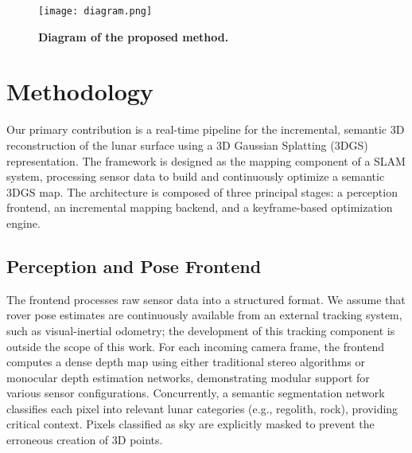 \begin{figure}[t]
	\centering
	\texttt{[image: diagram.png]}
	\caption{\bfseries Diagram of the proposed method.}
	\label{fig:3dgs_diagram}
\end{figure}

\section{Methodology}
Our primary contribution is a real-time pipeline for the incremental, semantic 3D reconstruction of the lunar surface using a 3D Gaussian Splatting (3DGS) representation. The framework is designed as the mapping component of a SLAM system, processing sensor data to build and continuously optimize a semantic 3DGS map. The architecture is composed of three principal stages: a perception frontend, an incremental mapping backend, and a keyframe-based optimization engine.

\subsection{Perception and Pose Frontend}
The frontend processes raw sensor data into a structured format. We assume that rover pose estimates are continuously available from an external tracking system, such as visual-inertial odometry; the development of this tracking component is outside the scope of this work. For each incoming camera frame, the frontend computes a dense depth map using either traditional stereo algorithms or monocular depth estimation networks, demonstrating modular support for various sensor configurations. Concurrently, a semantic segmentation network classifies each pixel into relevant lunar categories (e.g., regolith, rock), providing critical context. Pixels classified as sky are explicitly masked to prevent the erroneous creation of 3D points.

